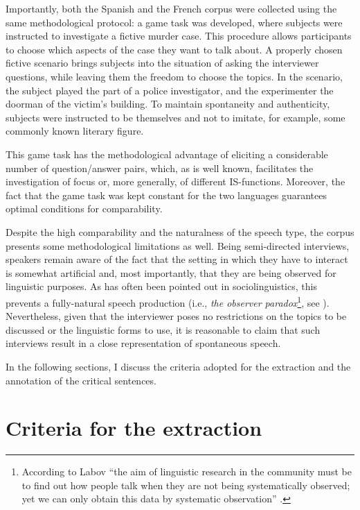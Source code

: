 Importantly, both the Spanish and the French corpus were collected using the same methodological protocol: a game task was developed, where  subjects were instructed to investigate a fictive murder case. This procedure allows participants to choose which aspects of the case they want to talk about. A properly chosen fictive scenario brings subjects into the situation of asking the interviewer questions, while leaving them the freedom to choose the topics. In the scenario, the subject played the part of a police investigator, and the experimenter the doorman of the victim’s building. To maintain spontaneity and authenticity, subjects were instructed to be themselves and not to imitate, for example, some commonly known literary figure.

This game task has the methodological advantage of eliciting a considerable number of question/answer pairs, which, as is well known, facilitates the investigation of focus or, more generally, of different IS-functions. Moreover, the fact that the game task was kept constant for the two languages guarantees optimal conditions for comparability. 

Despite the high comparability and the naturalness of the speech type, the corpus presents some methodological limitations as well. Being semi-directed interviews, speakers remain aware of the fact that the setting in which they have to interact is somewhat artificial and, most importantly, that they are being observed for linguistic purposes. As has often been pointed out in sociolinguistics, this prevents a fully-natural speech production (i.e., \textit{the observer paradox}\footnote{According to Labov ``the aim of linguistic research in the community must be to find out how people talk when they are not being systematically observed; yet we can only obtain this data by systematic observation” \parencite[209]{labov1972sociolinguistic}.}, see \cite{labov1972sociolinguistic}). Nevertheless, given that the interviewer poses no restrictions on the topics to be discussed or the linguistic forms to use, it is reasonable to claim that such interviews result in a close representation of spontaneous speech. 

In the following sections, I discuss the criteria adopted for the extraction and the annotation of the critical sentences.


\section {Criteria for the extraction}


